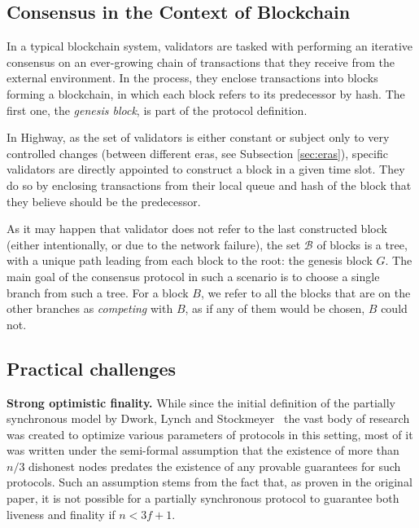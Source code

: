 \documentclass[12pt, fleqn]{article}
\begin{document}
\subsection{Consensus in the Context of Blockchain}

In a typical blockchain system, validators are tasked with performing an iterative consensus on an ever-growing chain of transactions that they receive from the external environment. 
In the process, they enclose transactions into blocks forming a blockchain, in which each block refers to its predecessor by hash.
The first one, the \emph{genesis block}, is part of the protocol definition. 

In Highway, as the set of validators is either constant or subject only to very controlled changes (between different eras, see Subsection \ref{sec:eras}), specific validators are directly appointed to construct a block in a given time slot.
They do so by enclosing transactions from their local queue and hash of the block that they believe should be the predecessor.

As it may happen that validator does not refer to the last constructed block (either intentionally, or due to the network failure), the set $\mathcal{B}$ of blocks is a tree, with a unique path leading from each block to the root: the genesis block $G$. 
The main goal of the consensus protocol in such a scenario is to choose a single branch from such a tree.
For a block $B$, we refer to all the blocks that are on the other branches as \emph{competing} with $B$, as if any of them would be chosen, $B$ could not.


\subsection{Practical challenges}

{\bf Strong optimistic finality.} While since the initial definition of the partially synchronous model by Dwork, Lynch and Stockmeyer~\cite{DLS88} the vast body of research was created to optimize various parameters of protocols in this setting, most of it was written under the semi-formal assumption that the existence of more than $n/3$ dishonest nodes predates the existence of any provable guarantees for such protocols.
Such an assumption stems from the fact that, as proven in the original paper, it is not possible for a partially synchronous protocol to guarantee both liveness and finality if $n<3f+1$.
\end{document}
